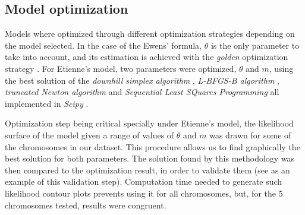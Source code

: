 \subsection{Model optimization}
\label{sec:model-optimization}

Models where optimized through different optimization strategies depending on the model selected. In the case of the Ewens' formula, $\theta$ is the only parameter to take into account, and its estimation is achieved with the \textit{golden} optimization strategy \cite{Jones2001}. For Etienne's model, two parameters were optimized, $\theta$ and $m$, using the best solution of the \textit{downhill simplex algorithm} \cite{Nelder1965}, \textit{L-BFGS-B algorithm} \cite{Byrd1995}, \textit{truncated Newton algorithm} \cite{Nash1984} and \textit{Sequential Least SQuares Programming} all implemented in \textit{Scipy} \cite{Jones2001}.

Optimization step being critical specially under Etienne's model, the likelihood surface of the model given a range of values of $\theta$ and $m$ was drawn for some of the chromosomes in our dataset. This procedure allows us to find graphically the best solution for both parameters. The solution found by this methodology was then compared to the optimization result, in order to validate them (see  as an example of this validation step). Computation time needed to generate such likelihood contour plots prevents using it for all chromosomes, but, for the 5 chromosomes tested, results were congruent.

